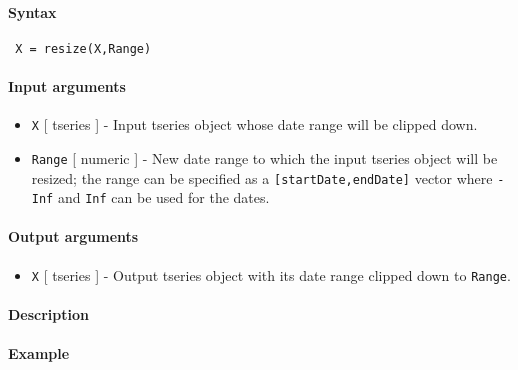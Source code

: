


	\paragraph{Syntax}
 
 \begin{verbatim}
 X = resize(X,Range)
 \end{verbatim}
 
 \paragraph{Input arguments}
 
 \begin{itemize}
 \item
   \texttt{X} {[} tseries {]} - Input tseries object whose date range
   will be clipped down.
 \item
   \texttt{Range} {[} numeric {]} - New date range to which the input
   tseries object will be resized; the range can be specified as a
   \texttt{{[}startDate,endDate{]}} vector where \texttt{-Inf} and
   \texttt{Inf} can be used for the dates.
 \end{itemize}
 
 \paragraph{Output arguments}
 
 \begin{itemize}
 \item
   \texttt{X} {[} tseries {]} - Output tseries object with its date range
   clipped down to \texttt{Range}.
 \end{itemize}
 
 \paragraph{Description}
 
 \paragraph{Example}


